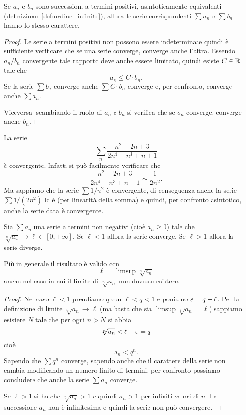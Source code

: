 \begin{corollary}
\mymark{*}
Se $a_n$ e $b_n$ sono successioni a termini positivi,
asintoticamente equivalenti (definizione~\ref{def:ordine_infinito}),
allora le serie corrispondenti $\sum a_n$ e $\sum b_n$
hanno lo stesso carattere.
\end{corollary}
%
\begin{proof}
\mymark{*}
Le serie a termini positivi non possono essere indeterminate
quindi è sufficiente verificare che se una serie converge, converge anche l'altra.
Essendo $a_n / b_n$ convergente tale rapporto deve anche essere
limitato, quindi esiste $C\in {\mathbb R}$ tale che
\[
   a_n \le C \cdot b_n.
\]
Se la serie $\sum b_n$ converge anche $\sum C \cdot b_n$ converge e, per confronto,
converge anche $\sum a_n$.

Viceversa, scambiando il ruolo di $a_n$ e $b_n$ si verifica che se $a_n$
converge, converge anche $b_n$.
\end{proof}

\begin{example}
La serie
\[
\sum_n \frac{n^2+2n+3}{2n^4-n^3+n+1}
\]
è convergente. Infatti si può facilmente verificare che
\[
   \frac{n^2+2n+3}{2n^4-n^3+n+1} \sim \frac{1}{2n^2}.
\]
Ma sappiamo che la serie $\sum 1/n^2$ è convergente, di conseguenza
anche la serie $\sum 1/(2n^2)$ lo è (per linearità della somma)
e quindi, per confronto
asintotico, anche la serie data è convergente.
\end{example}

\begin{theorem}
Sia $\sum a_n$ una serie a termini non negativi
(cioè $a_n\ge 0$) tale che
\mymark{***}
$\sqrt[n]{a_n} \to \ell \in [0,+\infty]$.
Se $\ell<1$ allora la serie converge.
Se $\ell>1$ allora la serie diverge.

Più in generale il risultato è valido con
\[
  \ell = \limsup \sqrt[n]{a_n}
\]
anche nel caso in cui il limite di $\sqrt[n]{a_n}$ non dovesse esistere.
\end{theorem}
%
\begin{proof}
\mymark{***}
Nel caso $\ell < 1$
prendiamo $q$ con $\ell < q < 1$ e poniamo $\varepsilon = q-\ell$.
Per la definizione di limite $\sqrt[n]{a_n}\to \ell$
(ma basta che sia $\limsup \sqrt[n]{a_n}=\ell$)
sappiamo
esistere $N$ tale che per ogni $n > N$ si abbia
\[
  \sqrt[n]{a_n} < \ell + \varepsilon = q
\]
cioè
\[
   a_n < q^n.
\]
Sapendo che $\sum q^n$ converge, sapendo anche che il carattere
della serie non cambia modificando un numero finito di termini,
per confronto possiamo concludere che anche la serie $\sum a_n$ converge.

Se $\ell>1$ si ha che $\sqrt[n]{a_n}>1$ e quindi $a_n>1$ per infiniti valori di $n$. La successione $a_n$ non è infinitesima e quindi la serie non può convergere.
\end{proof}

